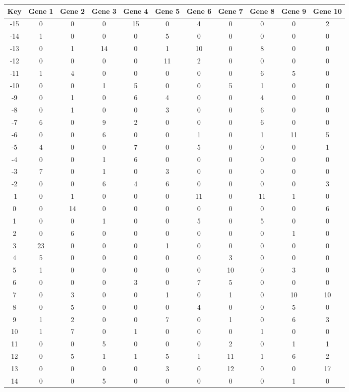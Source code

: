 \begin{tabular}{|c|c|c|c|c|c|c|c|c|c|c|}
\hline
Key & Gene 1 & Gene 2 & Gene 3 & Gene 4 & Gene 5 & Gene 6 & Gene 7 & Gene 8 & Gene 9 & Gene 10 \\
\hline
-15 & 0 & 0 & 0 & 15 & 0 & 4 & 0 & 0 & 0 & 2 \\
-14 & 1 & 0 & 0 & 0 & 5 & 0 & 0 & 0 & 0 & 0 \\
-13 & 0 & 1 & 14 & 0 & 1 & 10 & 0 & 8 & 0 & 0 \\
-12 & 0 & 0 & 0 & 0 & 11 & 2 & 0 & 0 & 0 & 0 \\
-11 & 1 & 4 & 0 & 0 & 0 & 0 & 0 & 6 & 5 & 0 \\
-10 & 0 & 0 & 1 & 5 & 0 & 0 & 5 & 1 & 0 & 0 \\
-9 & 0 & 1 & 0 & 6 & 4 & 0 & 0 & 4 & 0 & 0 \\
-8 & 0 & 1 & 0 & 0 & 3 & 0 & 0 & 6 & 0 & 0 \\
-7 & 6 & 0 & 9 & 2 & 0 & 0 & 0 & 6 & 0 & 0 \\
-6 & 0 & 0 & 6 & 0 & 0 & 1 & 0 & 1 & 11 & 5 \\
-5 & 4 & 0 & 0 & 7 & 0 & 5 & 0 & 0 & 0 & 1 \\
-4 & 0 & 0 & 1 & 6 & 0 & 0 & 0 & 0 & 0 & 0 \\
-3 & 7 & 0 & 1 & 0 & 3 & 0 & 0 & 0 & 0 & 0 \\
-2 & 0 & 0 & 6 & 4 & 6 & 0 & 0 & 0 & 0 & 3 \\
-1 & 0 & 1 & 0 & 0 & 0 & 11 & 0 & 11 & 1 & 0 \\
0 & 0 & 14 & 0 & 0 & 0 & 0 & 0 & 0 & 0 & 6 \\
1 & 0 & 0 & 1 & 0 & 0 & 5 & 0 & 5 & 0 & 0 \\
2 & 0 & 6 & 0 & 0 & 0 & 0 & 0 & 0 & 1 & 0 \\
3 & 23 & 0 & 0 & 0 & 1 & 0 & 0 & 0 & 0 & 0 \\
4 & 5 & 0 & 0 & 0 & 0 & 0 & 3 & 0 & 0 & 0 \\
5 & 1 & 0 & 0 & 0 & 0 & 0 & 10 & 0 & 3 & 0 \\
6 & 0 & 0 & 0 & 3 & 0 & 7 & 5 & 0 & 0 & 0 \\
7 & 0 & 3 & 0 & 0 & 1 & 0 & 1 & 0 & 10 & 10 \\
8 & 0 & 5 & 0 & 0 & 0 & 4 & 0 & 0 & 5 & 0 \\
9 & 1 & 2 & 0 & 0 & 7 & 0 & 1 & 0 & 6 & 3 \\
10 & 1 & 7 & 0 & 1 & 0 & 0 & 0 & 1 & 0 & 0 \\
11 & 0 & 0 & 5 & 0 & 0 & 0 & 2 & 0 & 1 & 1 \\
12 & 0 & 5 & 1 & 1 & 5 & 1 & 11 & 1 & 6 & 2 \\
13 & 0 & 0 & 0 & 0 & 3 & 0 & 12 & 0 & 0 & 17 \\
14 & 0 & 0 & 5 & 0 & 0 & 0 & 0 & 0 & 1 & 0 \\
\hline
\end{tabular}
